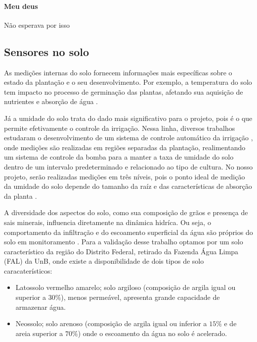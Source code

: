		\paragraph*{Meu deus}

			Não esperava por isso
			

	\subsection{Sensores no solo}

		As medições internas do solo fornecem informações mais específicas sobre o estado da plantação e o seu desenvolvimento. Por exemplo, a temperatura do solo tem impacto no processo de germinação das plantas, afetando sua aquisição de nutrientes e absorção de água \cite{bib_sen_01_jose}.	

		Já a umidade do solo trata do dado mais significativo para o projeto, pois é o que permite efetivamente o controle da irrigação. Nessa linha, diversos trabalhos estudaram o desenvolvimento de um sistema de controle automático da irrigação \cite{romero2012research} \cite{zhao2009study}, onde medições são realizadas em regiões separadas da plantação, realimentando um sistema de controle da bomba para a manter a taxa de umidade do solo dentro de um intervalo predeterminado e relacionado ao tipo de cultura. No nosso projeto, serão realizadas medições em três níveis, pois o ponto ideal de medição da umidade do solo depende do tamanho da raíz e das características de absorção da planta \cite{su2014critical}.
	
		A diversidade dos aspectos do solo, como sua composição de grãos e presença de sais minerais, influencia diretamente na dinâmica hidríca. Ou seja, o comportamento da infiltração e do escoamento superficial da água são próprios do solo em monitoramento \cite{bib_sen_01_ian}. Para a validação desse trabalho optamos por um solo característico da região do Distrito Federal, retirado da Fazenda Água Limpa (FAL) da UnB, onde existe a disponibilidade de dois tipos de solo caracaterísticos:

		\begin{itemize}
			\item Latossolo vermelho amarelo; solo argiloso (composição de argila igual ou superior a $30\%$), menos permeável, apresenta grande capacidade de armazenar água.
			\item Neossolo; solo arenoso (composição de argila igual ou inferior a $15\%$ e de areia superior a $70\%$) onde o escoamento da água no solo é acelerado.    
	    \end{itemize}	   

